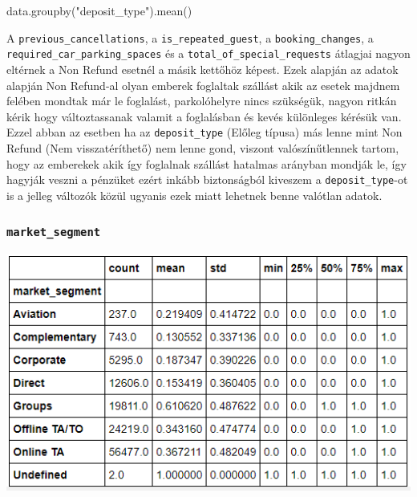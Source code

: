 \begin{python}
data.groupby("deposit_type").mean()
\end{python}

A \texttt{previous\_cancellations}, a \texttt{is\_repeated\_guest}, a \texttt{booking\_changes}, a \texttt{required\_car\_parking\_spaces} és a \texttt{total\_of\_special\_requests} átlagjai nagyon eltérnek a Non Refund esetnél a másik kettőhöz képest. Ezek alapján az adatok alapján Non Refund-al olyan emberek foglaltak szállást akik az esetek majdnem felében mondtak már le foglalást, parkolóhelyre nincs szükségük, nagyon ritkán kérik hogy változtassanak valamit a foglalásban és kevés különleges kérésük van. Ezzel abban az esetben ha az \texttt{deposit\_type} (Előleg típusa) más lenne mint Non Refund (Nem visszatéríthető) nem lenne gond, viszont valószínűtlennek tartom, hogy az emberekek akik így foglalnak szállást hatalmas arányban mondják le, így hagyják veszni a pénzüket ezért inkább biztonságból kiveszem a \texttt{deposit\_type}-ot is a jelleg változók közül ugyanis ezek miatt lehetnek benne valótlan adatok.

\subsubsection{\texttt{market\_segment}}
\includegraphics{images/4.fejezet/4.korrelacios3.png}


